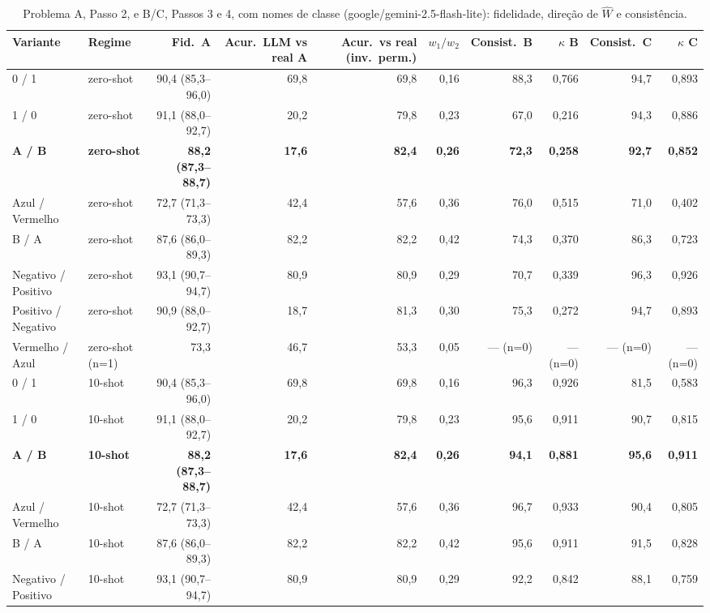 \begin{table}[htbp]
\centering
\small
\caption{Problema A, Passo 2, e B/C, Passos 3 e 4, com nomes de classe (google/gemini-2.5-flash-lite): fidelidade, direção de $\hat{W}$ e consistência.}
\label{tab:bloco1_vies_nomes_classe_flashlite}
\begin{tabular}{llrrrrrrrr}
\toprule
Variante & Regime & Fid.\ A & Acur.\ LLM vs real A & Acur.\ vs real (inv.\ perm.) & $w_1/w_2$ & Consist.\ B & $\kappa$ B & Consist.\ C & $\kappa$ C \\
\midrule
0 / 1 & zero-shot & 90,4 (85,3–96,0) & 69,8 & 69,8 & 0,16 & 88,3 & 0,766 & 94,7 & 0,893 \\
1 / 0 & zero-shot & 91,1 (88,0–92,7) & 20,2 & 79,8 & 0,23 & 67,0 & 0,216 & 94,3 & 0,886 \\
\textbf{A / B} & \textbf{zero-shot} & \textbf{88,2 (87,3–88,7)} & \textbf{17,6} & \textbf{82,4} & \textbf{0,26} & \textbf{72,3} & \textbf{0,258} & \textbf{92,7} & \textbf{0,852} \\
Azul / Vermelho & zero-shot & 72,7 (71,3–73,3) & 42,4 & 57,6 & 0,36 & 76,0 & 0,515 & 71,0 & 0,402 \\
B / A & zero-shot & 87,6 (86,0–89,3) & 82,2 & 82,2 & 0,42 & 74,3 & 0,370 & 86,3 & 0,723 \\
Negativo / Positivo & zero-shot & 93,1 (90,7–94,7) & 80,9 & 80,9 & 0,29 & 70,7 & 0,339 & 96,3 & 0,926 \\
Positivo / Negativo & zero-shot & 90,9 (88,0–92,7) & 18,7 & 81,3 & 0,30 & 75,3 & 0,272 & 94,7 & 0,893 \\
\midrule
Vermelho / Azul & zero-shot (n=1) & 73,3 & 46,7 & 53,3 & 0,05 & — (n=0) & — (n=0) & — (n=0) & — (n=0) \\
\midrule
0 / 1 & 10-shot & 90,4 (85,3–96,0) & 69,8 & 69,8 & 0,16 & 96,3 & 0,926 & 81,5 & 0,583 \\
1 / 0 & 10-shot & 91,1 (88,0–92,7) & 20,2 & 79,8 & 0,23 & 95,6 & 0,911 & 90,7 & 0,815 \\
\textbf{A / B} & \textbf{10-shot} & \textbf{88,2 (87,3–88,7)} & \textbf{17,6} & \textbf{82,4} & \textbf{0,26} & \textbf{94,1} & \textbf{0,881} & \textbf{95,6} & \textbf{0,911} \\
Azul / Vermelho & 10-shot & 72,7 (71,3–73,3) & 42,4 & 57,6 & 0,36 & 96,7 & 0,933 & 90,4 & 0,805 \\
B / A & 10-shot & 87,6 (86,0–89,3) & 82,2 & 82,2 & 0,42 & 95,6 & 0,911 & 91,5 & 0,828 \\
Negativo / Positivo & 10-shot & 93,1 (90,7–94,7) & 80,9 & 80,9 & 0,29 & 92,2 & 0,842 & 88,1 & 0,759 \\

\end{tabular}
\end{table}

